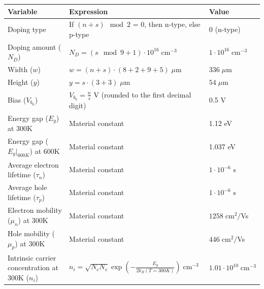 \documentclass{book}
\begin{document}
            \begin{center}
                \renewcommand{\arraystretch}{1.8}
                \begin{tabular}{ | m{4.5cm} | m{7.5cm} | m{2.5cm} | }
                    \hline 
                        \textbf{Variable} & \textbf{Expression} & \textbf{Value} \\
                    \hline
                        Doping type & If $(n + s) \mod 2$ = 0, then n-type, else p-type & 0 (n-type) \\ 
                    \hline
                        Doping amount ($N_{D}$) & $N_{D} = (s \mod 9 + 1) \cdot 10^{16} \; \text{cm}^{-3}$ & $1 \cdot 10^{16} \; \text{cm}^{-3}$ \\
                    \hline 
                        Width ($w$) & $w = (n + s) \cdot (8 + 2 + 9 + 5) \; \mu\text{m}$ & $336 \; \mu\text{m}$ \\
                    \hline
                        Height ($y$) & $y = s \cdot (3 + 3) \; \mu\text{m}$ & $54 \; \mu\text{m}$ \\ 
                    \hline
                        Bias ($V_{b_0}$) & $\displaystyle V_{b_0} = \frac{n}{s}$ V (rounded to the first decimal digit) & 0.5 V \\[4pt]
                    \hline
                        Energy gap ($E_{g}$) at 300K & Material constant & 1.12 eV \\
                    \hline
                        Energy gap ($E_{g}\vert_{600K}$) at 600K & Material constant & 1.037 eV \\
                    \hline
                        Average electron lifetime ($\tau_{n}$) & Material constant & $1 \cdot 10^{-6}$ s \\
                    \hline
                        Average hole lifetime ($\tau_{p}$) & Material constant & $1 \cdot 10^{-6}$ s \\
                    \hline
                        Electron mobility ($\mu_{n}$) at 300K & Material constant & $1258 \; \text{cm}^{2}/$Vs \\
                    \hline
                        Hole mobility ($\mu_{p}$) at 300K & Material constant & $446 \; \text{cm}^{2}/$Vs \\
                    \hline
                        Intrinsic carrier concentration at 300K ($n_i$) & $n_{i} = \sqrt{N_{c}N_{v}}\exp\left(-\frac{E_{g}}{2k_{B}(T = 300K)}\right) \; \text{cm}^{-3}$  &  $1.01 \cdot 10^{10} \; \text{cm}^{-3}$ \\

\end{tabular}
\end{center}
\end{document}
